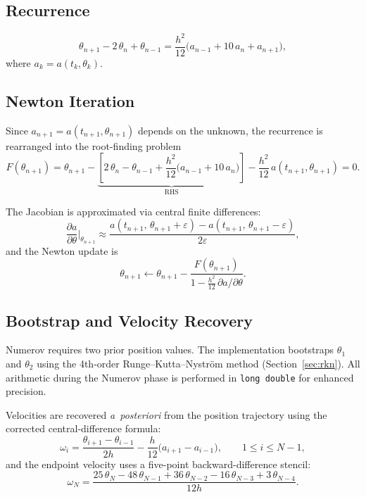 \documentclass[11pt,a4paper]{article}
\begin{document}
\subsection{Recurrence}
\begin{equation}\label{eq:numerov}
  \theta_{n+1} - 2\,\theta_n + \theta_{n-1}
  = \frac{h^2}{12}\bigl(a_{n-1} + 10\,a_n + a_{n+1}\bigr),
\end{equation}
where $a_k = a(t_k,\theta_k)$.

\subsection{Newton Iteration}

Since $a_{n+1} = a(t_{n+1},\theta_{n+1})$ depends on the unknown, the
recurrence is rearranged into the root-finding problem
\begin{equation}\label{eq:numerov-root}
  F(\theta_{n+1}) = \theta_{n+1}
  - \underbrace{\left[2\,\theta_n - \theta_{n-1}
    + \frac{h^2}{12}\bigl(a_{n-1} + 10\,a_n\bigr)\right]}_{\text{RHS}}
  - \frac{h^2}{12}\,a(t_{n+1},\theta_{n+1}) = 0.
\end{equation}

The Jacobian is approximated via central finite differences:
\begin{equation}\label{eq:numerov-jac}
  \frac{\partial a}{\partial\theta}\bigg|_{\theta_{n+1}}
  \approx
  \frac{a(t_{n+1},\,\theta_{n+1}+\varepsilon) - a(t_{n+1},\,\theta_{n+1}-\varepsilon)}{2\varepsilon},
\end{equation}
and the Newton update is
\begin{equation}\label{eq:numerov-update}
  \theta_{n+1} \leftarrow \theta_{n+1}
  - \frac{F(\theta_{n+1})}{1 - \tfrac{h^2}{12}\,\partial a / \partial\theta}.
\end{equation}

\subsection{Bootstrap and Velocity Recovery}

Numerov requires two prior position values. The implementation bootstraps
$\theta_1$ and $\theta_2$ using the 4th-order Runge--Kutta--Nystr\"{o}m method
(Section~\ref{sec:rkn}). All arithmetic during the Numerov phase is performed in
\texttt{long double} for enhanced precision.

Velocities are recovered \emph{a~posteriori} from the position trajectory using
the corrected central-difference formula:
\begin{equation}\label{eq:numerov-vel}
  \omega_i = \frac{\theta_{i+1} - \theta_{i-1}}{2h}
             - \frac{h}{12}\bigl(a_{i+1} - a_{i-1}\bigr),
  \qquad 1 \le i \le N-1,
\end{equation}
and the endpoint velocity uses a five-point backward-difference stencil:
\begin{equation}\label{eq:numerov-endpoint}
  \omega_N = \frac{25\,\theta_N - 48\,\theta_{N-1} + 36\,\theta_{N-2}
             - 16\,\theta_{N-3} + 3\,\theta_{N-4}}{12h}.
\end{equation}
\end{document}
